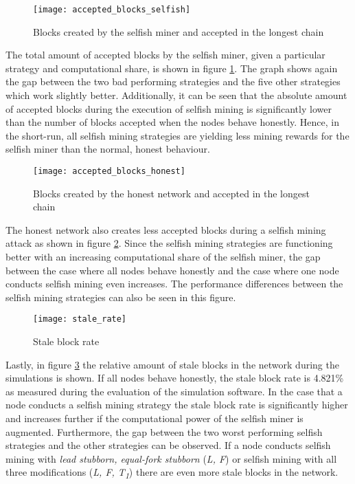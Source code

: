 \begin{figure}[t]
\texttt{[image: accepted\_blocks\_selfish]}
\centering
\caption{Blocks created by the selfish miner and accepted in the longest chain}
\label{fig:accepted_blocks_selfish}
\end{figure}

The total amount of accepted blocks by the selfish miner, given a particular strategy and computational share, is shown in figure \ref{fig:accepted_blocks_selfish}.
The graph shows again the gap between the two bad performing strategies and the five other strategies which work slightly better.
Additionally, it can be seen that the absolute amount of accepted blocks during the execution of selfish mining is significantly lower than the number of blocks accepted when the nodes behave honestly.
Hence, in the short-run, all selfish mining strategies are yielding less mining rewards for the selfish miner than the normal, honest behaviour.

\begin{figure}[t]
\texttt{[image: accepted\_blocks\_honest]}
\centering
\caption{Blocks created by the honest network and accepted in the longest chain}
\label{fig:accepted_blocks_honest}
\end{figure}

The honest network also creates less accepted blocks during a selfish mining attack as shown in figure \ref{fig:accepted_blocks_honest}.
Since the selfish mining strategies are functioning better with an increasing computational share of the selfish miner, the gap between the case where all nodes behave honestly and the case where one node conducts selfish mining even increases.
The performance differences between the selfish mining strategies can also be seen in this figure.

\begin{figure}[t]
\texttt{[image: stale\_rate]}
\centering
\caption{Stale block rate}
\label{fig:stale_rate}
\end{figure}

Lastly, in figure \ref{fig:stale_rate} the relative amount of stale blocks in the network during the simulations is shown.
If all nodes behave honestly, the stale block rate is 4.821\% as measured during the evaluation of the simulation software.
In the case that a node conducts a selfish mining strategy the stale block rate is significantly higher and increases further if the computational power of the selfish miner is augmented.
Furthermore, the gap between the two worst performing selfish strategies and the other strategies can be observed.
If a node conducts selfish mining with \textit{lead stubborn, equal-fork stubborn} (\textit{L, F}) or selfish mining with all three modifications (\textit{L, F, T\textsubscript{1}}) there are even more stale blocks in the network.

